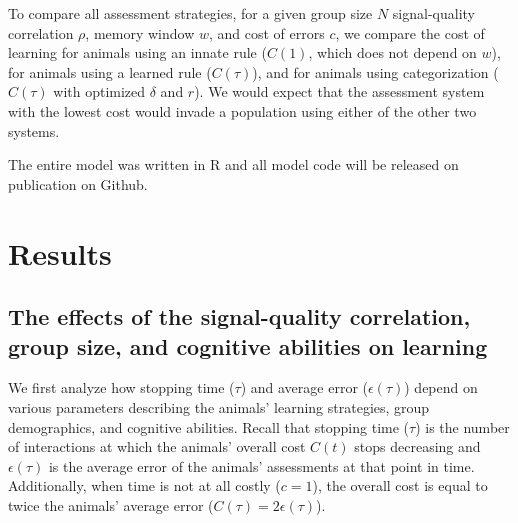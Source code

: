To compare all assessment strategies, for a given group size $N$ signal-quality correlation $\rho$, memory window $w$, and cost of errors $c$, we compare the cost of learning for animals using an innate rule ($C(1)$, which does not depend on $w$), for animals using a learned rule ($C(\tau)$), and for animals using categorization ($C(\tau)$ with optimized $\delta$ and $r$). We would expect that the assessment system with the lowest cost would invade a population using either of the other two systems.


The entire model was written in R and all model code will be released on publication on Github.

\section*{Results}
\subsection*{The effects of the signal-quality correlation, group size, and cognitive abilities on learning}
We first analyze how stopping time ($\tau$)  and average error ($\epsilon(\tau)$) depend on various parameters describing the animals' learning strategies, group demographics, and cognitive abilities. Recall that stopping time ($\tau$) is the number of interactions at which the animals' overall cost $C(t)$ stops decreasing and $\epsilon(\tau)$ is the average error of the animals' assessments at that point in time. Additionally, when time is not at all costly ($c=1$), the overall cost is equal to twice the animals' average error ($C(\tau)=2\epsilon(\tau)$).

